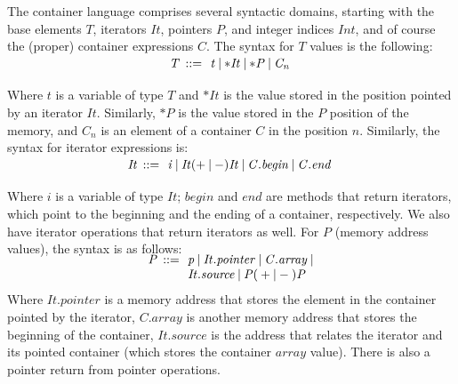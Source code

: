 \documentclass[a4paper]{llncs}
\begin{document}
The container language comprises several syntactic domains, starting with
the base elements $\mathit{T}$, iterators $\mathit{It}$, pointers $\mathit{P}$,
and integer indices $\mathit{Int}$, and of course the (proper)
container expressions $\mathit{C}$. The syntax for $\mathit{T}$
values is the following:
%
\[\begin{array}{r@{\:\:}c@{\:\:}l}\label{element-semantics}
\\[-5ex]
\mathit{T}   & ::= & \: \mathit{t} \: | \: \mathit{*It} \: | \: \mathit{*P} \: | \: \mathit{C_n} \:  \\
\end{array}
\]
%
Where $\mathit{t}$ is a variable of type $\mathit{T}$ and
$\mathit{*It}$ is the value stored in the position pointed
by an iterator $\mathit{It}$. Similarly, $\mathit{*P}$ is the value
stored in the $\mathit{P}$ position of the memory, and $\mathit{C_n}$ is
an element of a container $\mathit{C}$ in the position $\mathit{n}$.
Similarly, the syntax for iterator expressions is:
%
\[\begin{array}{r@{\:\:}c@{\:\:}l}\label{iterator-semantics}
\\[-5ex]
\mathit{It}   & ::= & \: \mathit{i} \: | \: \mathit{It} ( + \: | \: - ) \mathit{It} \: | \: \mathit{C.begin} \: | \: \mathit{C.end} \:  \\
\end{array}
\]
%
Where $\mathit{i}$ is a variable of type $\mathit{It}$;
$\mathit{begin}$ and $\mathit{end}$ are methods
that return iterators, which point to the beginning
and the ending of a container, respectively. We also have
iterator operations that return iterators as well.
For $\mathit{P}$ (memory address values), the syntax is as follows:
%
\[\begin{array}{r@{\:\:}c@{\:\:}l}\label{pointer-semantics}
\\[-5ex]
\mathit{P}  & ::= & \: \mathit{p} \: | \: \mathit{It.pointer} \: | \: \mathit{C.array} \: | \\
            &     & \: \mathit{It.source} \: | \: \mathit{P}  ( \: + \: | \: - \: )  \textit{P} \: \\
\end{array}
\]
%
Where $\mathit{It.pointer}$ is a memory address that stores the element
in the container pointed by the iterator, $\mathit{C.array}$ is another
memory address that stores the beginning of the container,
$\mathit{It.source}$ is the address that relates the iterator
and its pointed container (which stores the container $array$ value).
There is also a pointer return from pointer operations.
\end{document}
